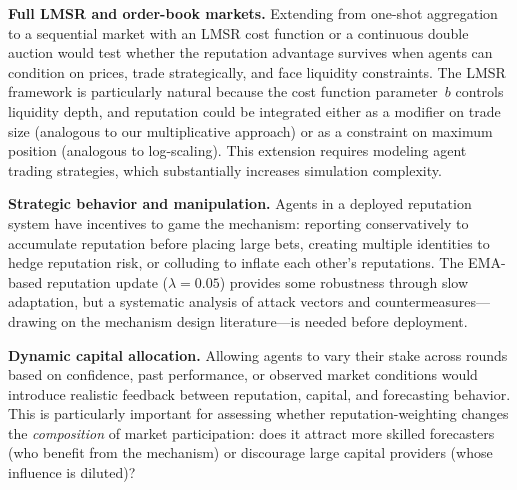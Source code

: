 \documentclass[conference]{IEEEtran}
\begin{document}
\textbf{Full LMSR and order-book markets.} Extending from one-shot aggregation to a sequential market with an LMSR cost function or a continuous double auction would test whether the reputation advantage survives when agents can condition on prices, trade strategically, and face liquidity constraints. The LMSR framework is particularly natural because the cost function parameter~$b$ controls liquidity depth, and reputation could be integrated either as a modifier on trade size (analogous to our multiplicative approach) or as a constraint on maximum position (analogous to log-scaling). This extension requires modeling agent trading strategies, which substantially increases simulation complexity.

\textbf{Strategic behavior and manipulation.} Agents in a deployed reputation system have incentives to game the mechanism: reporting conservatively to accumulate reputation before placing large bets, creating multiple identities to hedge reputation risk, or colluding to inflate each other's reputations. The EMA-based reputation update ($\lambda = 0.05$) provides some robustness through slow adaptation, but a systematic analysis of attack vectors and countermeasures---drawing on the mechanism design literature---is needed before deployment.

\textbf{Dynamic capital allocation.} Allowing agents to vary their stake across rounds based on confidence, past performance, or observed market conditions would introduce realistic feedback between reputation, capital, and forecasting behavior. This is particularly important for assessing whether reputation-weighting changes the \emph{composition} of market participation: does it attract more skilled forecasters (who benefit from the mechanism) or discourage large capital providers (whose influence is diluted)?
\end{document}
